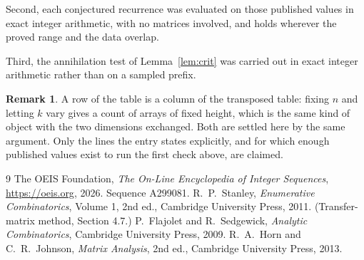 \documentclass[11pt,a4paper]{article}
\theoremstyle{plain}
\theoremstyle{definition}
\newtheorem{remark}[theorem]{Remark}
\begin{document}
Second, each conjectured recurrence was evaluated on those published values in exact
integer arithmetic, with no matrices involved, and holds wherever the proved range and the
data overlap.

Third, the annihilation test of Lemma~\ref{lem:crit} was carried out in exact integer
arithmetic rather than on a sampled prefix.

\begin{remark}
A row of the table is a column of the transposed table: fixing $n$ and letting $k$ vary gives a
count of arrays of fixed height, which is the same kind of object with the two dimensions
exchanged. Both are settled here by the same argument. Only the lines the entry states
explicitly, and for which enough published values exist to run the first check above, are
claimed.
\end{remark}

\begin{thebibliography}{9}
 The OEIS Foundation, \emph{The On-Line Encyclopedia of Integer
Sequences}, \url{https://oeis.org}, 2026. Sequence A299081.
 R.~P.~Stanley, \emph{Enumerative Combinatorics}, Volume 1, 2nd ed.,
Cambridge University Press, 2011. (Transfer-matrix method, Section 4.7.)
 P.~Flajolet and R.~Sedgewick, \emph{Analytic Combinatorics}, Cambridge
University Press, 2009.
 R.~A.~Horn and C.~R.~Johnson, \emph{Matrix Analysis}, 2nd ed., Cambridge
University Press, 2013.
\end{thebibliography}
\end{document}
